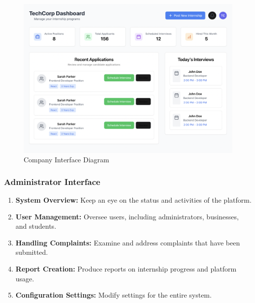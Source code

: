 \begin{figure}[H]
    \begin{center}
        \includegraphics[width=0.82\linewidth]{JhaBhatiaSharma/Images/Mockups/CompanyInterface.png}
        \caption{Company Interface Diagram}
        \label{fig:CompanyInterface}%
    \end{center}
\end{figure}

\subsubsection{Administrator Interface}
\begin{enumerate}
    \item \textbf{System Overview:} Keep an eye on the status and activities of the platform.
    \item \textbf{User Management:} Oversee users, including administrators, businesses, and students.
    \item \textbf{Handling Complaints:} Examine and address complaints that have been submitted.
    \item \textbf{Report Creation:} Produce reports on internship progress and platform usage.
    \item \textbf{Configuration Settings:} Modify settings for the entire system.
\end{enumerate}

